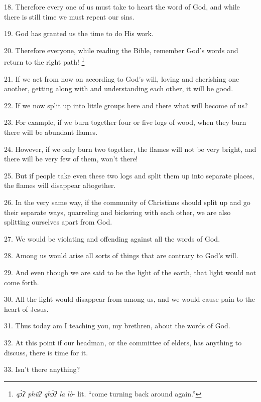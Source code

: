 18. Therefore every one of us must take to heart the word of God, and while there
is still time we must repent our sins.

19. God has granted us the time to do His work.

20. Therefore everyone, while reading the Bible, remember God's words and return
to the right path! \footnote{\textit{qɔ̀ʔ phûʔ qhɔ̀ʔ la lò}- lit. ``come turning back around again.''}

21. If we act from now on according to God's will, loving and cherishing one another,
getting along with and understanding each other, it will be good.

22. If we now split up into little groups here and there what will become of us?

23. For example, if we burn together four or five logs of wood, when they burn
there will be abundant flames.

24. However, if we only burn two together, the flames will not be very bright,
and there will be very few of them, won't there!

25. But if people take even these two logs and split them up into separate places,
the flames will disappear altogether.

26. In the very same way, if the community of Christians should split up and go
their separate ways, quarreling and bickering with each other, we are also splitting
ourselves apart from God.

27. We would be violating and offending against all the words of God.

28. Among us would arise all sorts of things that are contrary to God's will.

29. And even though we are said to be the light of the earth, that light would
not come forth.

30. All the light would disappear from among us, and we would cause pain to the
heart of Jesus.

31. Thus today am I teaching you, my brethren, about the words of God.

32. At this point if our headman, or the committee of elders, has anything to discuss,
there is time for it.

33. Isn't there anything?


